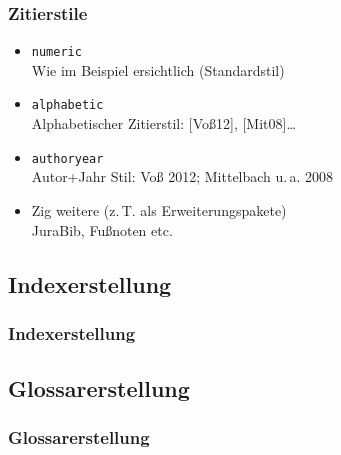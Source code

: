 \begin{frame}
  \frametitle{Zitierstile}
  \begin{itemize}
  \item \texttt{numeric}\\
    Wie im Beispiel ersichtlich (Standardstil)
  \item \texttt{alphabetic}\\
    Alphabetischer Zitierstil: [Voß12], [Mit08]\dots
  \item \texttt{authoryear}\\
    Autor+Jahr Stil: Voß 2012; Mittelbach u.\,a. 2008
  \item Zig weitere (z.\,T. als Erweiterungspakete)\\
    JuraBib, Fußnoten etc.
  \end{itemize}
\end{frame}

\subsection{Indexerstellung}
\begin{frame}
  \frametitle{Indexerstellung}
  
\end{frame}

\subsection{Glossarerstellung}
\begin{frame}
  \frametitle{Glossarerstellung}
  
\end{frame}
